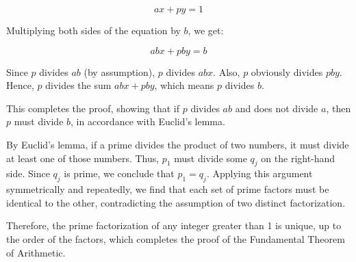 \documentclass[oneside]{book}
\begin{document}
{{	\[ax + py = 1\]

	Multiplying both sides of the equation by \(b\), we get:

	\[abx + pby = b\]

	Since \(p\) divides \(ab\) (by assumption), \(p\) divides \(abx\). Also, \(p\) obviously divides \(pby\). Hence, \(p\) divides the sum \(abx + pby\), which means \(p\) divides \(b\).

	This completes the proof, showing that if \(p\) divides \(ab\) and does not divide \(a\), then \(p\) must divide \(b\), in accordance with Euclid's lemma.}

By Euclid's lemma, if a prime divides the product of two numbers, it must divide at least one of those numbers. Thus, $p_1$ must divide some $q_j$ on the right-hand side. Since $q_j$ is prime, we conclude that $p_1 = q_j$. Applying this argument symmetrically and repeatedly, we find that each set of prime factors must be identical to the other, contradicting the assumption of two distinct factorization.

Therefore, the prime factorization of any integer greater than 1 is unique, up to the order of the factors, which completes the proof of the Fundamental Theorem of Arithmetic.
}

\end{document}
